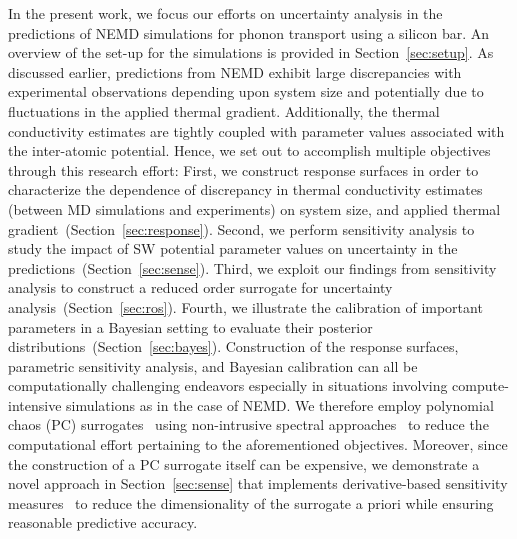In the present work, we focus our efforts on uncertainty analysis in the predictions of NEMD simulations
for phonon transport using a silicon bar. An overview of the set-up for the simulations is
provided in Section~\ref{sec:setup}. As discussed earlier, predictions from NEMD
exhibit large discrepancies with experimental observations depending upon system size and potentially
due to fluctuations in the applied thermal gradient. Additionally, the thermal conductivity estimates are
tightly coupled with parameter values associated with the inter-atomic potential. Hence, we set out to
accomplish multiple objectives through this research effort: First, we construct response surfaces
in order to characterize the dependence of discrepancy in thermal conductivity estimates (between
MD simulations and experiments) on system size, and applied thermal gradient~(Section~\ref{sec:response}).
Second, we perform sensitivity analysis to study the impact of SW potential parameter values on 
uncertainty in the predictions~(Section~\ref{sec:sense}).
Third, we exploit our findings from sensitivity analysis to 
construct a reduced order surrogate for uncertainty analysis~(Section~\ref{sec:ros}). 
Fourth, we illustrate the calibration
of important parameters in a Bayesian setting to evaluate their posterior
distributions~(Section~\ref{sec:bayes}). Construction of the
response surfaces, parametric sensitivity analysis, and Bayesian calibration can all be computationally
challenging endeavors especially in situations involving compute-intensive simulations as in the
case of NEMD. We therefore employ polynomial chaos (PC) surrogates~\cite{Xiu:2002,Ghanem:1990}
using non-intrusive spectral approaches~\cite{Olivier:2010} to reduce the computational effort pertaining
to the aforementioned objectives. Moreover, since the construction of a PC surrogate itself can be
expensive, we demonstrate a novel approach in Section~\ref{sec:sense} that implements derivative-based
sensitivity measures~\cite{Sobol:2010} to reduce the dimensionality of the surrogate a priori while
ensuring reasonable predictive accuracy. 
